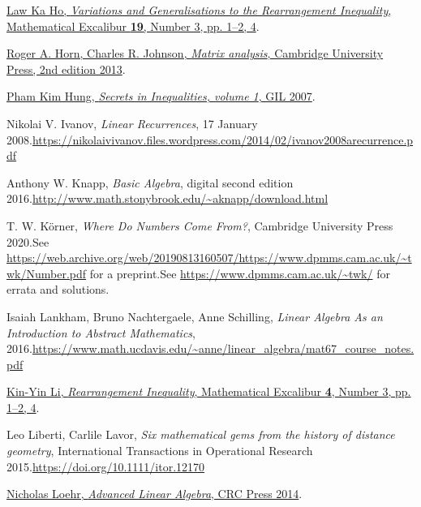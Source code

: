 \documentclass[numbers=enddot,12pt,final,onecolumn,notitlepage]{scrartcl}%
\numberwithin{exer}{subsection}
\theoremstyle{definition}
\begin{document}
\begin{thebibliography}{99999999}
%
\href{https://www.math.hkust.edu.hk/excalibur/v19_n3.pdf}{Law Ka Ho,
\textit{Variations and Generalisations to the Rearrangement Inequality},
Mathematical Excalibur \textbf{19}, Number 3, pp. 1--2, 4}.

%
\href{http://www.cse.zju.edu.cn/eclass/attachments/2015-10/01-1446086008-145421.pdf}{Roger
A. Horn, Charles R. Johnson, \textit{Matrix analysis}, Cambridge University
Press, 2nd edition 2013}.

%
\href{http://refkol.ro/matek/mathbooks/!Books!/Secrets in Inequalities (volume 1) Pham Kim Hung.pdf}{Pham
Kim Hung, \textit{Secrets in Inequalities, volume 1}, GIL 2007}.

Nikolai V. Ivanov, \textit{Linear Recurrences}, 17
January 2008.\newline\url{https://nikolaivivanov.files.wordpress.com/2014/02/ivanov2008arecurrence.pdf}

Anthony W. Knapp, \textit{Basic Algebra}, digital
second edition 2016.\newline\url{http://www.math.stonybrook.edu/~aknapp/download.html}

T. W. K\"{o}rner, \textit{Where Do Numbers Come
From?}, Cambridge University Press 2020.\newline See
\url{https://web.archive.org/web/20190813160507/https://www.dpmms.cam.ac.uk/~twk/Number.pdf}
for a preprint.\newline See \url{https://www.dpmms.cam.ac.uk/~twk/} for errata
and solutions.

Isaiah Lankham, Bruno Nachtergaele, Anne
Schilling, \textit{Linear Algebra As an Introduction to Abstract Mathematics},
2016.\newline\url{https://www.math.ucdavis.edu/~anne/linear_algebra/mat67_course_notes.pdf}

%
\href{https://www.math.hkust.edu.hk/excalibur/v4_n3.pdf}{Kin-Yin Li,
\textit{Rearrangement Inequality}, Mathematical Excalibur \textbf{4}, Number
3, pp. 1--2, 4}.

Leo Liberti, Carlile Lavor, \textit{Six
mathematical gems from the history of distance geometry}, International
Transactions in Operational Research 2015.\newline\url{https://doi.org/10.1111/itor.12170}

%
\href{https://elblogdecontar.files.wordpress.com/2017/01/ebookdaraz-advanced-linear-algebra.pdf}{Nicholas
Loehr, \textit{Advanced Linear Algebra}, CRC Press 2014}.


\end{thebibliography}
\end{document}
